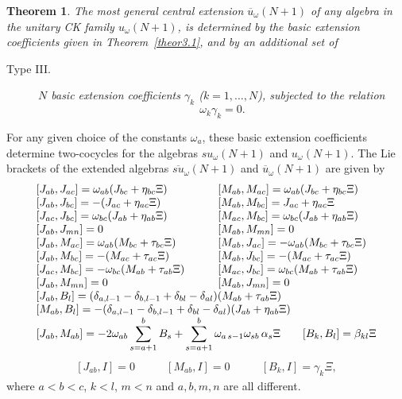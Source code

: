 \documentclass[12pt]{article}
\newtheorem{theorem}{Theorem}[section]
\begin{document}
\begin{theorem}
\label{theor3.2}
The most general central extension $\overline{u}_{\omega}(N+1)$ of
any algebra in the unitary CK family
${u}_{\omega}(N+1)$, is determined by the basic extension
coefficients given in Theorem~\ref{theor3.1}, and by an additional set of

\begin{description}
\item[Type III.]
$N$ basic extension coefficients ${\gamma}_{k}$
($k=1,\dots,N$), subjected to the relation
\begin{equation}
{\omega}_k {\gamma}_{k}=0.
\label{urestrict}
\end{equation}
\end{description}
\end{theorem}
For any given choice of the constants ${\omega}_a$, these basic extension
coefficients determine two-cocycles for the algebras
${su}_{\omega}(N+1)$ and
${u}_{\omega}(N+1)$. The Lie brackets of the extended algebras
$\overline{su}_{\omega}(N+1)$ and $\overline{u}_{\omega}(N+1)$ are
given by
\begin{equation}
\begin{array}{ll}
[{J}_{ab},{J}_{ac}] ={\omega}_{ab}({J}_{bc}+{\eta}_{bc}\Xi) &\qquad
[{M}_{ab},{M}_{ac}] ={\omega}_{ab}({J}_{bc}+{\eta}_{bc}\Xi)\cr
[{J}_{ab},{J}_{bc}] =-({J}_{ac} +{\eta}_{ac}\Xi) &\qquad
[{M}_{ab},{M}_{bc}] ={J}_{ac}+{\eta}_{ac}\Xi\cr
[{J}_{ac},{J}_{bc}] ={\omega}_{bc}({J}_{ab} + {\eta}_{ab}\Xi) &\qquad
[{M}_{ac},{M}_{bc}] ={\omega}_{bc}({J}_{ab} + {\eta}_{ab}\Xi) \cr
[{J}_{ab},{J}_{mn}]=0 &\qquad
[{M}_{ab},{M}_{mn}] =0\cr
[{J}_{ab},{M}_{ac}] ={\omega}_{ab}({M}_{bc}+{\tau}_{bc} \Xi) &\qquad
[{M}_{ab},{J}_{ac}] =-{\omega}_{ab}({M}_{bc} +  {\tau}_{bc}\Xi)
\cr
[{J}_{ab},{M}_{bc}] =-({M}_{ac}+ {\tau}_{ac} \Xi) &\qquad
[{M}_{ab},{J}_{bc}] =-({M}_{ac} + {\tau}_{ac} \Xi)
\cr
[{J}_{ac},{M}_{bc}] =-{\omega}_{bc}({M}_{ab} +{\tau}_{ab}\Xi) &\qquad
[{M}_{ac},{J}_{bc}] ={\omega}_{bc}({M}_{ab} + {\tau}_{ab} \Xi)
\cr
[{J}_{ab},{M}_{mn}] =0 &\qquad
[{M}_{ab},{J}_{mn}] =0 \cr
\multicolumn{2}{l}{
[{J}_{ab},{B}_l] = ( \delta_{a,l-1} -\delta_{b,l-1}  +
\delta_{bl} -\delta_{al}) ({M}_{ab} + {\tau}_{ab} \Xi)}\cr
\multicolumn{2}{l}{
[{M}_{ab},{B}_l] = - ( \delta_{a,l-1} -\delta_{b,l-1}  +
\delta_{bl} -\delta_{al})({J}_{ab}   + {\eta}_{ab} \Xi)}\cr
\multicolumn{2}{l}
{\displaystyle
[{J}_{ab},{M}_{ab}]=-2{\omega}_{ab}\sum_{s=a+1}^b {B}_s +
\sum_{s=a+1}^b{\omega}_{a\,s-1}{\omega}_{sb}\,{\alpha}_{s} \Xi  \qquad
[{B}_k,{B}_l]={\beta}_{kl}\Xi}
\end{array}
\label{CKusuGenExtCR}
\end{equation}
\begin{equation}
\begin{array}{lll}
[{J}_{ab},{I}] = 0  & \qquad
[{M}_{ab},{I}] = 0  & \qquad
[{B}_k,{I}] ={\gamma}_k \Xi,
\label{CKuGenExtCR}
\end{array}
\end{equation}
where $a<b<c$, $k<l$, $m<n$  and $a,b,m,n$ are all different.
\end{document}
